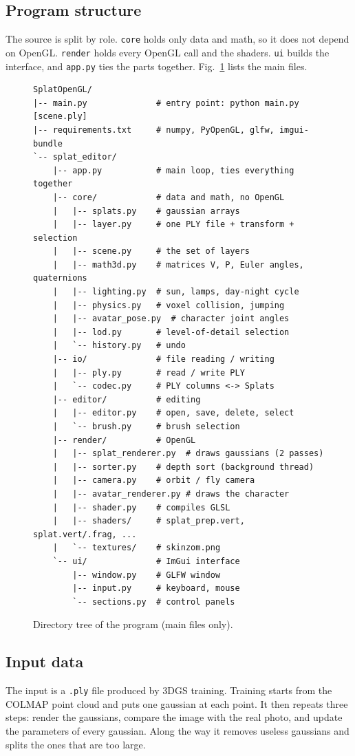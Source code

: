 \documentclass[9pt,twocolumn,a4paper]{extarticle}
\newcommand{\code}[1]{\texttt{#1}}
\begin{document}
\subsection{Program structure}
The source is split by role. \code{core} holds only data and math, so it does not depend on OpenGL. \code{render} holds every OpenGL call and the shaders. \code{ui} builds the interface, and \code{app.py} ties the parts together. Fig.~\ref{fig:tree} lists the main files.

\begin{figure}[H]
\centering
\begin{Verbatim}[fontsize=\fontsize{5.6}{6.6}\selectfont,frame=single]
SplatOpenGL/
|-- main.py              # entry point: python main.py [scene.ply]
|-- requirements.txt     # numpy, PyOpenGL, glfw, imgui-bundle
`-- splat_editor/
    |-- app.py           # main loop, ties everything together
    |-- core/            # data and math, no OpenGL
    |   |-- splats.py    # gaussian arrays
    |   |-- layer.py     # one PLY file + transform + selection
    |   |-- scene.py     # the set of layers
    |   |-- math3d.py    # matrices V, P, Euler angles, quaternions
    |   |-- lighting.py  # sun, lamps, day-night cycle
    |   |-- physics.py   # voxel collision, jumping
    |   |-- avatar_pose.py  # character joint angles
    |   |-- lod.py       # level-of-detail selection
    |   `-- history.py   # undo
    |-- io/              # file reading / writing
    |   |-- ply.py       # read / write PLY
    |   `-- codec.py     # PLY columns <-> Splats
    |-- editor/          # editing
    |   |-- editor.py    # open, save, delete, select
    |   `-- brush.py     # brush selection
    |-- render/          # OpenGL
    |   |-- splat_renderer.py  # draws gaussians (2 passes)
    |   |-- sorter.py    # depth sort (background thread)
    |   |-- camera.py    # orbit / fly camera
    |   |-- avatar_renderer.py # draws the character
    |   |-- shader.py    # compiles GLSL
    |   |-- shaders/     # splat_prep.vert, splat.vert/.frag, ...
    |   `-- textures/    # skinzom.png
    `-- ui/              # ImGui interface
        |-- window.py    # GLFW window
        |-- input.py     # keyboard, mouse
        `-- sections.py  # control panels
\end{Verbatim}
\caption{Directory tree of the program (main files only).}
\label{fig:tree}
\end{figure}

\subsection{Input data}
\label{sec:input}
The input is a \code{.ply} file produced by 3DGS training. Training starts from the COLMAP point cloud and puts one gaussian at each point. It then repeats three steps: render the gaussians, compare the image with the real photo, and update the parameters of every gaussian. Along the way it removes useless gaussians and splits the ones that are too large.
\end{document}
